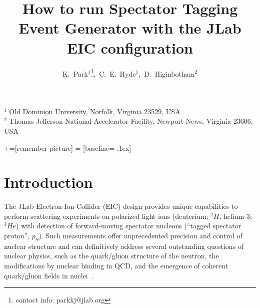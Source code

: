 \documentclass[12pt,letterpaper]{article}
\begin{document}
\title{How to run Spectator Tagging Event Generator with the JLab EIC configuration}
\author{K.~Park$^{1}$\footnote{contact info: parkkj@jlab.org},~C.~E.~Hyde$^{1}$,~D.~Higinbotham$^{2}$\\}
\maketitle
\begin{center}
$^1$ Old Dominion University, Norfolk, Virginia 23529, USA\\
$^2$ Thomas Jefferson National Accelerator Facility, Newport News, Virginia 23606, USA\\
\end{center}


+=[remember picture]
 = [baseline=-.1ex]



\modulolinenumbers[1]
\linenumbers


\clearpage
\tableofcontents
\clearpage


\section{Introduction}

The JLab Electron-Ion-Collider (EIC) design provides unique capabilities to perform
scattering experiments on polarized light ions (deuterium; ${}^2H$, helium-3; ${}^3He$) with detection 
of forward-moving spectator nucleons (``tagged spectator proton'', $p_S$). Such measurements offer unprecedented 
precision and control of nuclear structure and can definitively address several outstanding questions 
of nuclear physics, such as the quark/gluon structure of the neutron, the modifications by nuclear 
binding in QCD, and the emergence of coherent quark/gluon fields in nuclei~\cite{CWeiss2014}.
\end{document}
